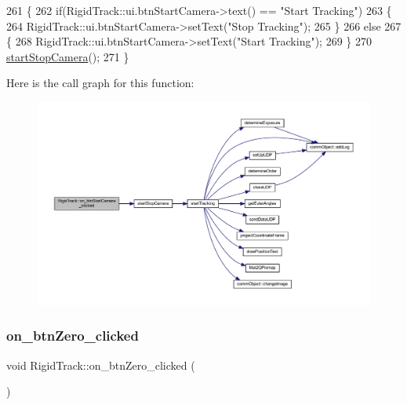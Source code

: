 \begin{DoxyCode}
261 \{
262     \textcolor{keywordflow}{if}(RigidTrack::ui.btnStartCamera->text() == \textcolor{stringliteral}{"Start Tracking"})
263     \{
264         RigidTrack::ui.btnStartCamera->setText(\textcolor{stringliteral}{"Stop Tracking"});
265     \}
266     \textcolor{keywordflow}{else}
267     \{
268         RigidTrack::ui.btnStartCamera->setText(\textcolor{stringliteral}{"Start Tracking"});
269     \}
270     \hyperlink{main_8cpp_a25183e8d0b386ef12b557efc712a0261}{startStopCamera}();
271 \}
\end{DoxyCode}
Here is the call graph for this function\+:
\nopagebreak
\begin{figure}[H]
\begin{center}
\leavevmode
\includegraphics[width=350pt]{class_rigid_track_a2f226856e28868c8bb1854fa16531f60_cgraph}
\end{center}
\end{figure}
\mbox{\label{class_rigid_track_afb1a4edcacc818db4ec6bb017dd07e0f}} 
\subsubsection{\texorpdfstring{on\+\_\+btn\+Zero\+\_\+clicked}{on\_btnZero\_clicked}}
{\footnotesize\ttfamily void Rigid\+Track\+::on\+\_\+btn\+Zero\+\_\+clicked (\begin{DoxyParamCaption}{ }\end{DoxyParamCaption})\hspace{0.3cm}{\ttfamily [slot]}}



